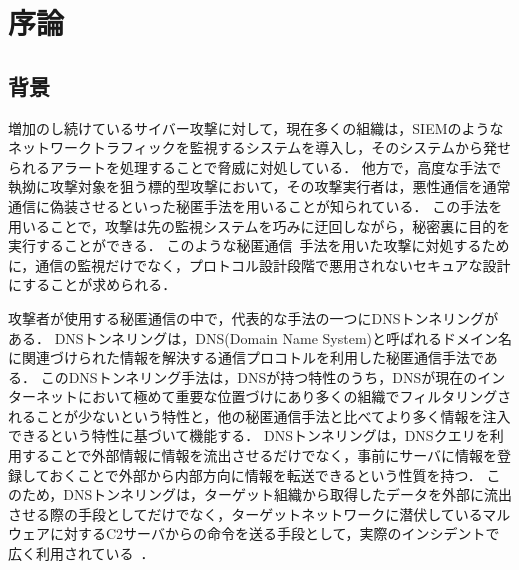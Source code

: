 \section{序論}
\subsection{背景}
増加のし続けているサイバー攻撃に対して，現在多くの組織は，SIEMのようなネットワークトラフィックを監視するシステムを導入し，そのシステムから発せられるアラートを処理することで脅威に対処している．
他方で，高度な手法で執拗に攻撃対象を狙う標的型攻撃において，その攻撃実行者は，悪性通信を通常通信に偽装させるといった秘匿手法を用いることが知られている．
この手法を用いることで，攻撃は先の監視システムを巧みに迂回しながら，秘密裏に目的を実行することができる．
このような秘匿通信~\cite{covertchannel}手法を用いた攻撃に対処するために，通信の監視だけでなく，プロトコル設計段階で悪用されないセキュアな設計にすることが求められる．

攻撃者が使用する秘匿通信の中で，代表的な手法の一つにDNSトンネリングがある．
DNSトンネリングは，DNS(Domain Name System)と呼ばれるドメイン名に関連づけられた情報を解決する通信プロコトルを利用した秘匿通信手法である．
このDNSトンネリング手法は，DNSが持つ特性のうち，DNSが現在のインターネットにおいて極めて重要な位置づけにあり多くの組織でフィルタリングされることが少ないという特性と，他の秘匿通信手法と比べてより多く情報を注入できるという特性に基づいて機能する．
DNSトンネリングは，DNSクエリを利用することで外部情報に情報を流出させるだけでなく，事前にサーバに情報を登録しておくことで外部から内部方向に情報を転送できるという性質を持つ．
このため，DNSトンネリングは，ターゲット組織から取得したデータを外部に流出させる際の手段としてだけでなく，ターゲットネットワークに潜伏しているマルウェアに対するC2サーバからの命令を送る手段として，実際のインシデントで広く利用されている~\cite{frameworkpos, bondupdater, bernhardpos, multigrainpos, pisloader, denis, dnsmessenger, udpos}．

